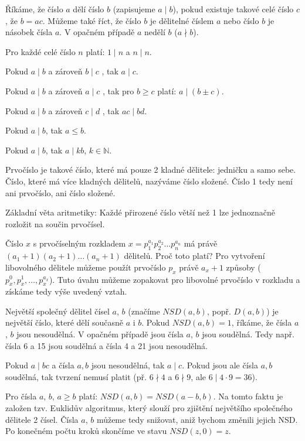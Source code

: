 \documentclass[12pt,a4paper]{report}
\begin{document}
\begin{description}
	\item Říkáme, že číslo $a$ dělí číslo $b$ (zapisujeme $a \mid b$), pokud existuje takové celé číslo $c$, že $b=ac$. Můžeme také říct, že číslo $b$ je dělitelné číslem $a$ nebo číslo $b$ je násobek čísla $a$. V opačném případě $a$ nedělí $b$ ($a \nmid b$).
	\item Pro každé celé číslo $n$ platí: $1\mid n$ a $n \mid n$.
	\item Pokud $a \mid b$ a zároveň $b \mid c$ , tak $a \mid c$.
	\item Pokud $a \mid b$ a zároveň $a \mid c$ , tak pro $b \geq c$ platí: $a \mid (b\pm c) $.
	\item Pokud $a \mid b$ a zároveň $c \mid d$ , tak $ac \mid bd $.
	\item Pokud $a \mid b$, tak $a\leq b$.
	\item Pokud $a \mid b$, tak $a \mid kb$, $k \in \mathbb{N}$.
	\item Prvočíslo je takové číslo, které má pouze 2 kladné dělitele: jedničku a samo sebe. Číslo, které má více kladných dělitelů, nazýváme číslo složené. Číslo 1 tedy není ani prvočíslo, ani číslo složené.
	\item Základní věta aritmetiky: Každé přirozené číslo větší než 1 lze jednoznačně rozložit na součin prvočísel.
	\item Číslo $x$ s prvočíselným rozkladem $x=p_1^{a_1}p_2^{a_2}\ldots p_n^{a_n}$ má právě $(a_1+1)(a_2+1)\ldots(a_n+1)$ dělitelů. Proč toto platí? Pro vytvoření libovolného dělitele můžeme použít prvočíslo $p_x$ právě $a_x+1$ způsoby ($p_x^0,p_x^1, \ldots , p_x^{a_x}$). Tuto úvahu můžeme zopakovat pro libovolné prvočíslo v rozkladu a získáme tedy výše uvedený vztah.
	\item Největší společný dělitel čísel $a$, $b$ (značíme $NSD(a,b)$, popř. $D(a,b)$) je největší číslo, které dělí současně $a$ i $b$. Pokud $NSD(a,b)=1$, říkáme, že čísla $a$, $b$ jsou nesoudělná. V opačném případě jsou čísla $a$, $b$ jsou soudělná. Tedy např. čísla 6 a 15 jsou soudělná a čísla 4 a 21 jsou nesoudělná.
	\item Pokud $a \mid bc$ a čísla $a,b$ jsou nesoudělná, tak $a \mid c$. Pokud jsou ale čísla $a,b$ soudělná, tak tvrzení nemusí platit (př. $6 \nmid 4$ a $6 \nmid 9$, ale $6\mid 4\cdot 9 =36$). 
	\item Pro čísla $a$, $b$, $a \geq b$ platí: $NSD(a,b)=NSD(a-b,b)$. Na tomto faktu je založen tzv. Euklidův algoritmus, který slouží pro zjištění největšího společného dělitele 2 čísel. Čísla $a$, $b$ můžeme tedy snižovat, aniž bychom změnili jejich NSD. Po konečném počtu kroků skončíme ve stavu $NSD(z, 0) = z$.

\end{description}
\end{document}
